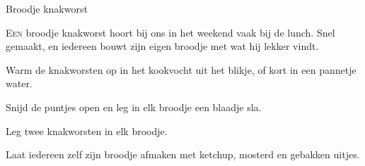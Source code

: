 \begin{recipe}{Broodje knakworst}


\lettrine{E}{en} broodje knakworst hoort bij ons in het weekend vaak bij de
lunch. Snel gemaakt, en iedereen bouwt zijn eigen broodje met wat hij lekker
vindt.

\begin{ingredients}
\end{ingredients}

\begin{steps}
  \item Warm de knakworsten op in het kookvocht uit het blikje, of kort in
        een pannetje water.
  \item Snijd de puntjes open en leg in elk broodje een blaadje sla.
  \item Leg twee knakworsten in elk broodje.
  \item Laat iedereen zelf zijn broodje afmaken met ketchup, mosterd en
        gebakken uitjes.
\end{steps}

\end{recipe}

